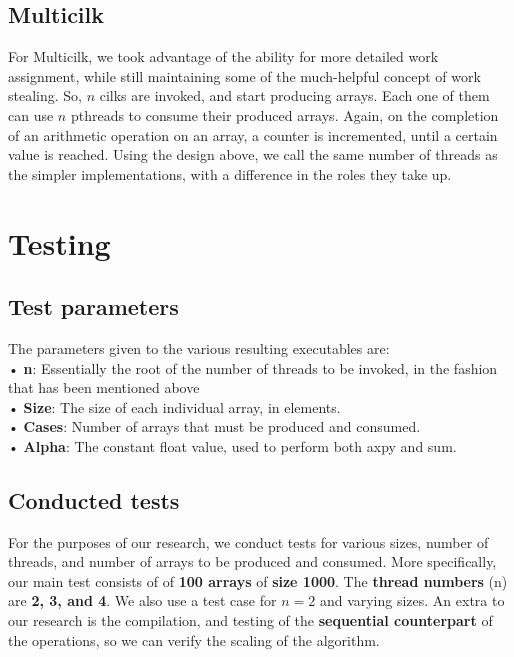 \documentclass[11pt,a4paper,onecolumn,final]{article}
\newcommand{\gr}[1]{\foreignlanguage{greek}{#1}}
\newcommand{\en}[1]{\foreignlanguage{english}{#1}}
\begin{document}
\subsection{Multicilk}
For Multicilk, we took advantage of the ability for more detailed work assignment, while still maintaining some of the much-helpful concept of work stealing. So, $n$ cilks are invoked, and start producing arrays. Each one of them can use $n$ pthreads to consume their produced arrays. Again, on the completion of an arithmetic operation on an array, a counter is incremented, until a certain value is reached. Using the design above, we call the same number of threads as the simpler implementations, with a difference in the roles they take up.
\section{Testing}
\subsection{Test parameters}
The parameters given to the various resulting executables are:\\
• \textbf{n}: Essentially the root of the number of threads to be invoked, in the fashion that has been mentioned above\\
• \textbf{Size}: The size of each individual array, in elements.\\
• \textbf{Cases}: Number of arrays that must be produced and consumed.\\
• \textbf{Alpha}: The constant float value, used to perform both axpy and sum.\\
\subsection{Conducted tests}
For the purposes of our research, we conduct tests for various sizes, number of threads, and number of arrays to be produced and consumed. More specifically, our main test consists of of \textbf{100 arrays} of \textbf{size 1000}. The \textbf{thread numbers} (n) are \textbf{2, 3, and 4}. We also use a test case for $n=2$ and varying sizes.
An extra to our research is the compilation, and testing of the \textbf{sequential counterpart} of the operations, so we can verify the scaling of the algorithm.




%
\end{document}
